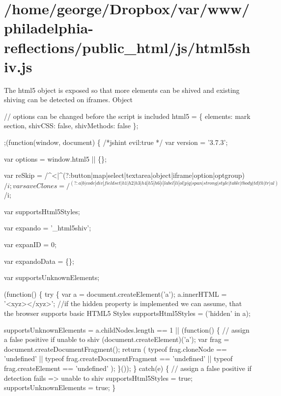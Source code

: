 \section{/home/george/\+Dropbox/var/www/philadelphia-\/reflections/public\+\_\+html/js/html5shiv.\+js}
The {\ttfamily html5} object is exposed so that more elements can be shived and existing shiving can be detected on iframes.  Object

// options can be changed before the script is included html5 = \{ \textquotesingle{}elements\textquotesingle{}\+: \textquotesingle{}mark section\textquotesingle{}, \textquotesingle{}shiv\+C\+SS\textquotesingle{}\+: false, \textquotesingle{}shiv\+Methods\textquotesingle{}\+: false \};


\begin{DoxyCodeInclude}

;(\textcolor{keyword}{function}(window, document) \{
\textcolor{comment}{/*jshint evil:true */}
  var version = \textcolor{stringliteral}{'3.7.3'};

  var options = window.html5 || \{\};

  var reSkip = /^<|^(?:button|map|select|textarea|\textcolor{keywordtype}{object}|iframe|option|optgroup)$/i;

  var saveClones = /^(?:a|b|code|div|fieldset|h1|h2|h3|h4|h5|h6|i|label|li|ol|p|q|span|strong|style|table|
      tbody|td|th|tr|ul)$/i;

  var supportsHtml5Styles;

  var expando = \textcolor{stringliteral}{'\_html5shiv'};

  var expanID = 0;

  var expandoData = \{\};

  var supportsUnknownElements;

  (\textcolor{keyword}{function}() \{
    \textcolor{keywordflow}{try} \{
        var a = document.createElement(\textcolor{charliteral}{'a'});
        a.innerHTML = \textcolor{stringliteral}{'<xyz></xyz>'};
        \textcolor{comment}{//if the hidden property is implemented we can assume, that the browser supports basic HTML5 Styles}
        supportsHtml5Styles = (\textcolor{stringliteral}{'hidden'} in a);

        supportsUnknownElements = a.childNodes.length == 1 || (\textcolor{keyword}{function}() \{
          \textcolor{comment}{// assign a false positive if unable to shiv}
          (document.createElement)(\textcolor{charliteral}{'a'});
          var frag = document.createDocumentFragment();
          \textcolor{keywordflow}{return} (
            typeof frag.cloneNode == \textcolor{stringliteral}{'undefined'} ||
            typeof frag.createDocumentFragment == \textcolor{stringliteral}{'undefined'} ||
            typeof frag.createElement == \textcolor{stringliteral}{'undefined'}
          );
        \}());
    \} \textcolor{keywordflow}{catch}(e) \{
      \textcolor{comment}{// assign a false positive if detection fails => unable to shiv}
      supportsHtml5Styles = \textcolor{keyword}{true};
      supportsUnknownElements = \textcolor{keyword}{true};
    \}


\end{DoxyCodeInclude}
